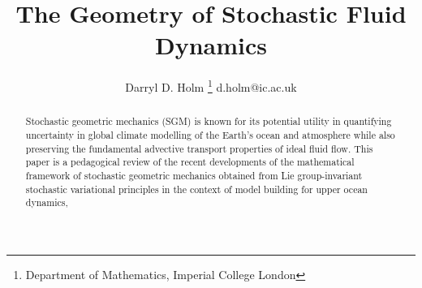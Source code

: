 \documentclass[11pt, oneside]{article}   	%
\numberwithin{equation}{section}
\theoremstyle{plain}
\theoremstyle{definition}
\theoremstyle{remark}
\newcommand{\<}{\langle}
\renewcommand{\>}{\rangle}
\begin{document}
\title{\textbf{The Geometry of Stochastic Fluid Dynamics}}
\author{Darryl D. Holm
\thanks{Department of Mathematics, Imperial College London}  
\footnotesize
d.holm@ic.ac.uk
}
\date{}%

\maketitle


\begin{abstract}
Stochastic geometric mechanics (SGM) is known for its potential utility in quantifying uncertainty in  global climate modelling of the Earth's ocean and atmosphere while also preserving the fundamental advective transport properties of ideal fluid flow. This paper is a pedagogical review  of the recent developments of the mathematical framework of stochastic geometric mechanics obtained from Lie group-invariant stochastic variational principles  in the context of model building for upper ocean dynamics, 
\end{abstract}
\vspace{-2mm}
\end{document}
